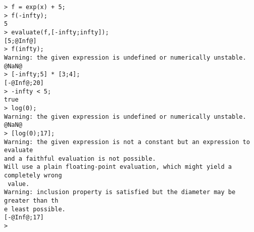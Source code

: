 \begin{center}\begin{minipage}{15cm}\begin{Verbatim}[frame=single]
> f = exp(x) + 5;
> f(-infty);
5
> evaluate(f,[-infty;infty]);
[5;@Inf@]
> f(infty);
Warning: the given expression is undefined or numerically unstable.
@NaN@
> [-infty;5] * [3;4];
[-@Inf@;20]
> -infty < 5;
true
> log(0);
Warning: the given expression is undefined or numerically unstable.
@NaN@
> [log(0);17];
Warning: the given expression is not a constant but an expression to evaluate
and a faithful evaluation is not possible.
Will use a plain floating-point evaluation, which might yield a completely wrong
 value.
Warning: inclusion property is satisfied but the diameter may be greater than th
e least possible.
[-@Inf@;17]
> 
\end{Verbatim}
\end{minipage}\end{center}

